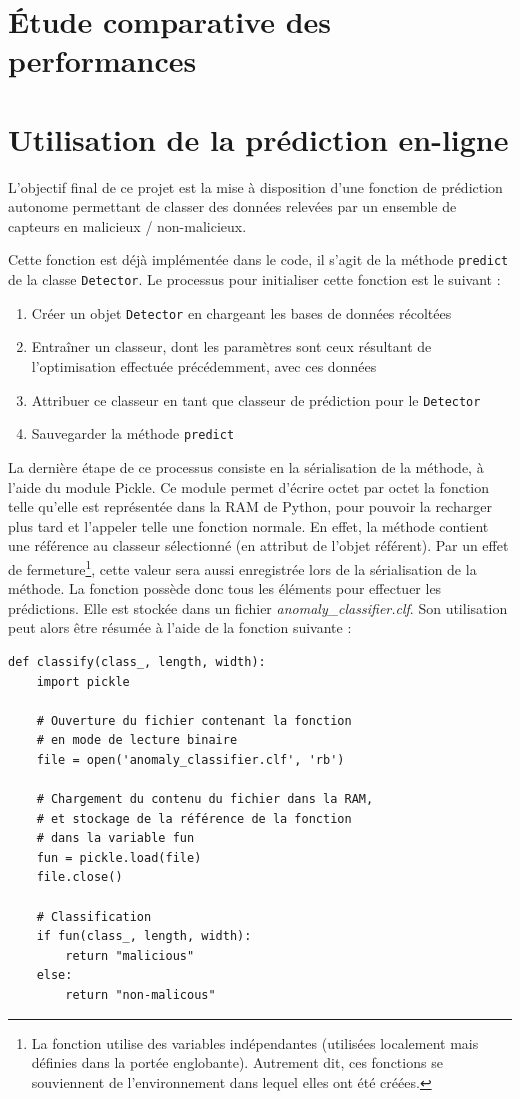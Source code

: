 \documentclass[a4paper]{report}
\begin{document}
\section{Étude comparative des performances}

\section{Utilisation de la prédiction en-ligne}

L'objectif final de ce projet est la mise à disposition d'une fonction de prédiction autonome permettant de classer des données relevées par un ensemble de capteurs en malicieux / non-malicieux.

Cette fonction est déjà implémentée dans le code, il s'agit de la méthode \texttt{predict} de la classe \texttt{Detector}. Le processus pour initialiser cette fonction est le suivant :
\begin{enumerate}
\item Créer un objet \texttt{Detector} en chargeant les bases de données récoltées
\item Entraîner un classeur, dont les paramètres sont ceux résultant de l'optimisation effectuée précédemment, avec ces données
\item Attribuer ce classeur en tant que classeur de prédiction pour le \texttt{Detector}
\item Sauvegarder la méthode \texttt{predict}
\end{enumerate}
La dernière étape de ce processus consiste en la sérialisation de la méthode, à l'aide du module Pickle. Ce module permet d'écrire octet par octet la fonction telle qu'elle est représentée dans la RAM de Python, pour pouvoir la recharger plus tard et l'appeler telle une fonction normale. En effet, la méthode contient une référence au classeur sélectionné (en attribut de l'objet référent). Par un effet de fermeture\footnote{La fonction utilise des variables indépendantes (utilisées localement mais définies dans la portée englobante). Autrement dit, ces fonctions se souviennent de l'environnement dans lequel elles ont été créées.}, cette valeur sera aussi enregistrée lors de la sérialisation de la méthode. La fonction possède donc tous les éléments pour effectuer les prédictions. Elle est stockée dans un fichier \emph{anomaly\_classifier.clf}. Son utilisation peut alors être résumée à l'aide de la fonction suivante :
\begin{verbatim}
def classify(class_, length, width):
    import pickle
    
    # Ouverture du fichier contenant la fonction
    # en mode de lecture binaire
    file = open('anomaly_classifier.clf', 'rb')
    
    # Chargement du contenu du fichier dans la RAM,
    # et stockage de la référence de la fonction
    # dans la variable fun
    fun = pickle.load(file)
    file.close()
    
    # Classification
    if fun(class_, length, width):
        return "malicious"
    else:
        return "non-malicous"
\end{verbatim}
\end{document}
